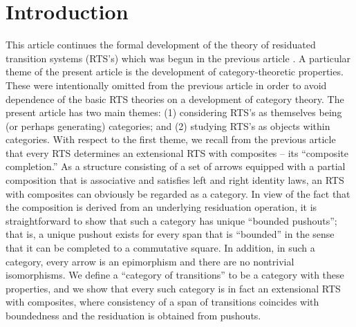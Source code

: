 \documentclass[11pt,notitlepage,a4paper]{report}
\begin{document}
{}
\tableofcontents

{}
\chapter*{Introduction}

This article continues the formal development of the theory of residuated transition systems
(RTS's) which was begun in the previous article \cite{ResiduatedTransitionSystem-AFP}.
A particular theme of the present article is the development of category-theoretic properties.
These were intentionally omitted from the previous article in order to avoid dependence of
the basic RTS theories on a development of category theory.
The present article has two main themes: (1) considering RTS's as themselves being
(or perhaps generating) categories; and (2) studying RTS's as objects within categories.
With respect to the first theme, we recall from the previous article that every RTS determines
an extensional RTS with composites -- its ``composite completion.''  As a structure consisting
of a set of arrows equipped with a partial composition that is associative and satisfies
left and right identity laws, an RTS with composites can obviously be regarded as a category.
In view of the fact that the composition is derived from an underlying residuation operation,
it is straightforward to show that such a category has unique ``bounded pushouts'';
that is, a unique pushout exists for every span that is ``bounded'' in the sense that it
can be completed to a commutative square.  In addition, in such a category, every arrow
is an epimorphism and there are no nontrivial isomorphisms.
We define a ``category of transitions'' to be a category with these properties, and we show
that every such category is in fact an extensional RTS with composites, where consistency
of a span of transitions coincides with boundedness and the residuation is obtained from
pushouts.
\end{document}
